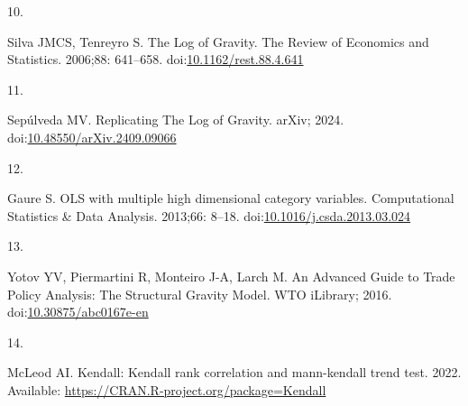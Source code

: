 \documentclass[
  10pt,
  letterpaper,
]{article}
\newlength{\cslhangindent}
\newlength{\csllabelwidth}
\newenvironment{CSLReferences}[2] %
 {\begin{list}{}{%
  \setlength{\itemindent}{0pt}
  \setlength{\leftmargin}{0pt}
  \setlength{\parsep}{0pt}
  \ifodd #1
   \setlength{\leftmargin}{\cslhangindent}
   \setlength{\itemindent}{-1\cslhangindent}
  \fi
  \setlength{\itemsep}{#2\baselineskip}}}
 {\end{list}}
\newcommand{\CSLLeftMargin}[1]{\parbox[t]{\csllabelwidth}{\strut#1\strut}}
\newcommand{\CSLRightInline}[1]{\parbox[t]{\linewidth - \csllabelwidth}{\strut#1\strut}}
\begin{document}
\begin{CSLReferences}{0}{1}
\CSLLeftMargin{10. }%
\CSLRightInline{Silva JMCS, Tenreyro S. The {Log} of {Gravity}. The
Review of Economics and Statistics. 2006;88: 641--658.
doi:\href{https://doi.org/10.1162/rest.88.4.641}{10.1162/rest.88.4.641}}

\CSLLeftMargin{11. }%
\CSLRightInline{Sepúlveda MV. Replicating {The} {Log} of {Gravity}.
arXiv; 2024.
doi:\href{https://doi.org/10.48550/arXiv.2409.09066}{10.48550/arXiv.2409.09066}}

\CSLLeftMargin{12. }%
\CSLRightInline{Gaure S. {OLS} with multiple high dimensional category
variables. Computational Statistics \& Data Analysis. 2013;66: 8--18.
doi:\href{https://doi.org/10.1016/j.csda.2013.03.024}{10.1016/j.csda.2013.03.024}}

\CSLLeftMargin{13. }%
\CSLRightInline{Yotov YV, Piermartini R, Monteiro J-A, Larch M. An
{Advanced} {Guide} to {Trade} {Policy} {Analysis}: {The} {Structural}
{Gravity} {Model}. WTO iLibrary; 2016.
doi:\href{https://doi.org/10.30875/abc0167e-en}{10.30875/abc0167e-en}}

\CSLLeftMargin{14. }%
\CSLRightInline{McLeod AI. Kendall: Kendall rank correlation and
mann-kendall trend test. 2022. Available:
\url{https://CRAN.R-project.org/package=Kendall}}

\end{CSLReferences}


\nolinenumbers
\end{document}
